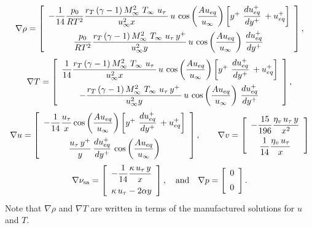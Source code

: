 \documentclass[10pt]{article}
\newcommand{\Dueqplusyplus}{\, \frac{du_{eq}^+}{dy^+}\,}
\newcommand{\sa}{\nu_{\mathrm{sa}}}
\begin{document}
\begin{equation*}
\nabla  \rho= \left[ \begin{array}{c}
- \dfrac{1}{14}\dfrac{p_0}{R T^2} \dfrac{r_T\, (\gamma-1)\, M_{\infty}^2 \, \,T_{\infty} \, \, u_\tau \, }{u_{\infty}^2 x}\, u \,\cos\left(\dfrac{A u_{eq}}{u_{\infty}}\right) \left[y^{+} \, \displaystyle\Dueqplusyplus+u_{eq}^{+}\right]\vspace{5pt} \\
 \dfrac{p_0}{R T^2}  \dfrac{r_T\, (\gamma-1)\, M_{\infty}^2 \, \,T_{\infty} \, \,  u_\tau\, y^{+}}{u_{\infty}^2 y}\, u \,\cos\left(\dfrac{A u_{eq}}{u_{\infty}}\right)   \displaystyle\Dueqplusyplus
\end{array} \right],
\end{equation*}
\begin{equation*}
\nabla T = \left[ \begin{array}{c}
 \dfrac{1}{14} \dfrac{r_T\, (\gamma-1)\, M_{\infty}^2 \, \,T_{\infty} \, \, u_\tau \, }{u_{\infty}^2 x}\, u \,\cos\left(\dfrac{A u_{eq}}{u_{\infty}}\right) \left[y^{+} \, \displaystyle\Dueqplusyplus+u_{eq}^{+}\right]\vspace{5pt}\\
- \dfrac{r_T\, (\gamma-1)\, M_{\infty}^2 \, \,T_{\infty} \, \,  u_\tau\,  y^{+} \, }{u_{\infty}^2 y}\, u \,\cos\left(\dfrac{A u_{eq}}{u_{\infty}}\right)  \displaystyle\Dueqplusyplus
\end{array} \right],
\end{equation*}
\begin{equation*}
\nabla u = \left[ \begin{array}{c}
  -\dfrac{1}{14}\dfrac{u_\tau }{x}\cos\left(\dfrac{A u_{eq}}{u_{\infty}}\right) \left[y^{+} \, \displaystyle\Dueqplusyplus+u_{eq}^{+}\right] \vspace{5pt}\\
 \dfrac{ u_\tau \, y^{+} }{y} \displaystyle\Dueqplusyplus \cos\left(\dfrac{A u_{eq}}{u_{\infty}}\right)
\end{array} \right],
%
\quad\quad
%
\nabla  v= \left[ \begin{array}{c}
 -\dfrac{15}{196}\dfrac{ \eta_v \, u_\tau \, y}{x^2} \vspace{5pt}\\
 \dfrac{1}{14}\dfrac{\eta_v \, u_\tau}{x}
\end{array} \right]
\end{equation*}
\begin{equation*}
\nabla \sa = \left[ \begin{array}{c}
 -\dfrac{1}{14}\dfrac{ \kappa \,  u_\tau \, y}{x} \vspace{5pt}\\
 \kappa \,  u_\tau - 2 \alpha y
\end{array} \right],
%
\quad\mbox{and}\quad
%
\nabla p = \left[ \begin{array}{c}
 0\vspace{5pt}\\
 0
\end{array} \right].
\end{equation*}
Note that $\nabla  \rho$ and $\nabla  T$ are written in terms of the manufactured solutions for $u$ and $T$. 
\end{document}
